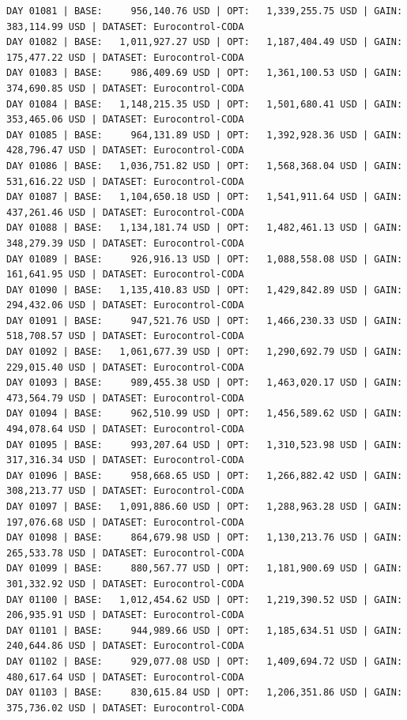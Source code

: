 \documentclass[11pt,a4paper]{article}
\begin{document}
\begin{verbatim}
DAY 01081 | BASE:     956,140.76 USD | OPT:   1,339,255.75 USD | GAIN: 383,114.99 USD | DATASET: Eurocontrol-CODA
DAY 01082 | BASE:   1,011,927.27 USD | OPT:   1,187,404.49 USD | GAIN: 175,477.22 USD | DATASET: Eurocontrol-CODA
DAY 01083 | BASE:     986,409.69 USD | OPT:   1,361,100.53 USD | GAIN: 374,690.85 USD | DATASET: Eurocontrol-CODA
DAY 01084 | BASE:   1,148,215.35 USD | OPT:   1,501,680.41 USD | GAIN: 353,465.06 USD | DATASET: Eurocontrol-CODA
DAY 01085 | BASE:     964,131.89 USD | OPT:   1,392,928.36 USD | GAIN: 428,796.47 USD | DATASET: Eurocontrol-CODA
DAY 01086 | BASE:   1,036,751.82 USD | OPT:   1,568,368.04 USD | GAIN: 531,616.22 USD | DATASET: Eurocontrol-CODA
DAY 01087 | BASE:   1,104,650.18 USD | OPT:   1,541,911.64 USD | GAIN: 437,261.46 USD | DATASET: Eurocontrol-CODA
DAY 01088 | BASE:   1,134,181.74 USD | OPT:   1,482,461.13 USD | GAIN: 348,279.39 USD | DATASET: Eurocontrol-CODA
DAY 01089 | BASE:     926,916.13 USD | OPT:   1,088,558.08 USD | GAIN: 161,641.95 USD | DATASET: Eurocontrol-CODA
DAY 01090 | BASE:   1,135,410.83 USD | OPT:   1,429,842.89 USD | GAIN: 294,432.06 USD | DATASET: Eurocontrol-CODA
DAY 01091 | BASE:     947,521.76 USD | OPT:   1,466,230.33 USD | GAIN: 518,708.57 USD | DATASET: Eurocontrol-CODA
DAY 01092 | BASE:   1,061,677.39 USD | OPT:   1,290,692.79 USD | GAIN: 229,015.40 USD | DATASET: Eurocontrol-CODA
DAY 01093 | BASE:     989,455.38 USD | OPT:   1,463,020.17 USD | GAIN: 473,564.79 USD | DATASET: Eurocontrol-CODA
DAY 01094 | BASE:     962,510.99 USD | OPT:   1,456,589.62 USD | GAIN: 494,078.64 USD | DATASET: Eurocontrol-CODA
DAY 01095 | BASE:     993,207.64 USD | OPT:   1,310,523.98 USD | GAIN: 317,316.34 USD | DATASET: Eurocontrol-CODA
DAY 01096 | BASE:     958,668.65 USD | OPT:   1,266,882.42 USD | GAIN: 308,213.77 USD | DATASET: Eurocontrol-CODA
DAY 01097 | BASE:   1,091,886.60 USD | OPT:   1,288,963.28 USD | GAIN: 197,076.68 USD | DATASET: Eurocontrol-CODA
DAY 01098 | BASE:     864,679.98 USD | OPT:   1,130,213.76 USD | GAIN: 265,533.78 USD | DATASET: Eurocontrol-CODA
DAY 01099 | BASE:     880,567.77 USD | OPT:   1,181,900.69 USD | GAIN: 301,332.92 USD | DATASET: Eurocontrol-CODA
DAY 01100 | BASE:   1,012,454.62 USD | OPT:   1,219,390.52 USD | GAIN: 206,935.91 USD | DATASET: Eurocontrol-CODA
DAY 01101 | BASE:     944,989.66 USD | OPT:   1,185,634.51 USD | GAIN: 240,644.86 USD | DATASET: Eurocontrol-CODA
DAY 01102 | BASE:     929,077.08 USD | OPT:   1,409,694.72 USD | GAIN: 480,617.64 USD | DATASET: Eurocontrol-CODA
DAY 01103 | BASE:     830,615.84 USD | OPT:   1,206,351.86 USD | GAIN: 375,736.02 USD | DATASET: Eurocontrol-CODA

\end{verbatim}
\end{document}
